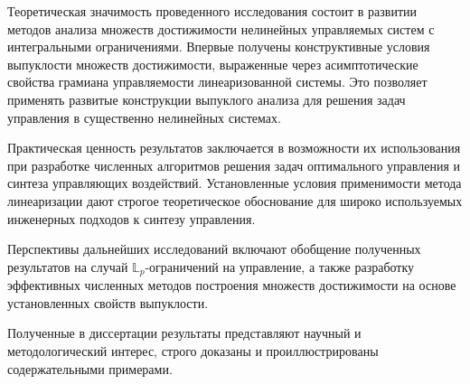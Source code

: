 \documentclass[../main.tex]{subfiles}
\begin{document}
Теоретическая значимость проведенного исследования состоит в развитии методов анализа множеств достижимости нелинейных управляемых систем с интегральными ограничениями. 
Впервые получены конструктивные условия выпуклости множеств достижимости, выраженные через асимптотические свойства грамиана управляемости линеаризованной системы. 
Это позволяет применять развитые конструкции выпуклого анализа для решения задач управления в существенно нелинейных системах.

Практическая ценность результатов заключается в возможности их использования при разработке численных алгоритмов решения задач оптимального управления и синтеза управляющих воздействий. 
Установленные условия применимости метода линеаризации дают строгое теоретическое обоснование для широко используемых инженерных подходов к синтезу управления.

Перспективы дальнейших исследований включают обобщение полученных результатов на случай $\mathbb{L}_p$-ограничений на управление, а также разработку эффективных численных методов построения множеств достижимости на основе установленных свойств выпуклости.

Полученные в диссертации результаты представляют научный и методологический интерес, строго доказаны и проиллюстрированы содержательными примерами.
\end{document}
